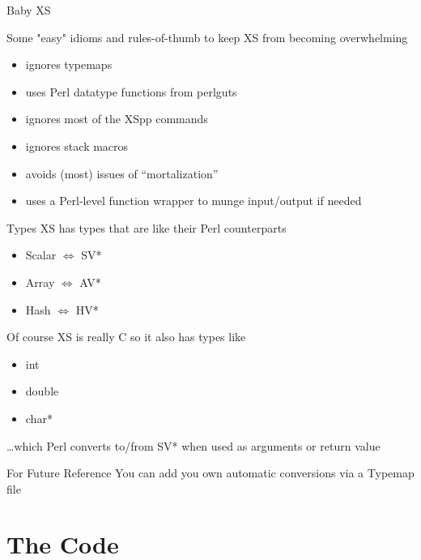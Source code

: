 \documentclass{beamer}
\begin{document}
\begin{frame}{Baby XS}
  \begin{block}{}
    Some "easy" idioms and rules-of-thumb to keep XS from becoming overwhelming
  \end{block}
  \begin{itemize}
    \item ignores typemaps
    \item uses Perl datatype functions from perlguts
    \item ignores most of the XSpp commands
    \item ignores stack macros
    \item avoids (most) issues of ``mortalization''
    \item uses a Perl-level function wrapper to munge input/output if needed
  \end{itemize}
\end{frame}

\begin{frame}{Types}
  XS has types that are like their Perl counterparts
  \begin{itemize}
    \item Scalar $\Leftrightarrow$ SV*
    \item Array $\Leftrightarrow$ AV*
    \item Hash $\Leftrightarrow$ HV*
  \end{itemize}
  Of course XS is really C so it also has types like
  \begin{itemize}
    \item int
    \item double
    \item char*
  \end{itemize}
  \ldots which Perl converts to/from SV* when used as arguments or return value
  \begin{block}{For Future Reference}
    You can add you own automatic conversions via a \alert{Typemap} file
  \end{block}
\end{frame}

\section{The Code}
\end{document}
